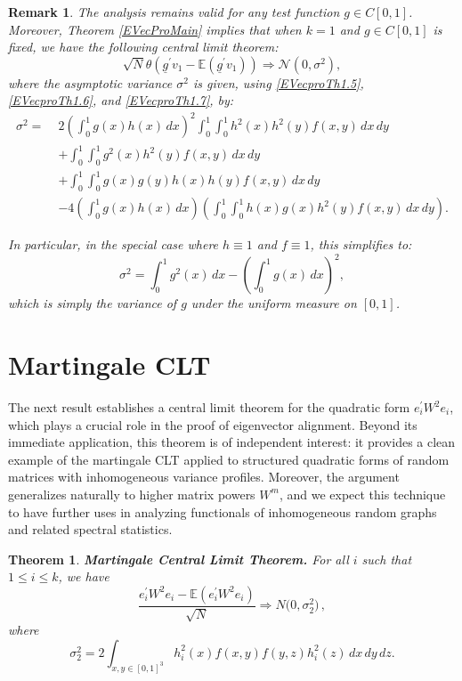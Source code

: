 \documentclass[11pt, reqno]{amsart}
\numberwithin{equation}{section}
\newtheorem{theorem}{Theorem}[section]
\newtheorem{remark}{Remark}[section]
\begin{document}
\begin{remark}\label{EVecproTh1.GaussianLimit}
The analysis remains valid for any test function \( g \in C[0,1] \). Moreover, Theorem \ref{EVecProMain} implies that when \( k = 1 \) and \( g \in C[0,1] \) is fixed, we have the following central limit theorem:
\[
\sqrt{N}\theta\left(\underline{g}^\prime v_1 - \mathbb{E}(\underline{g}^\prime v_1)\right) \Rightarrow \mathcal{N}(0, \sigma^2),
\]
where the asymptotic variance \( \sigma^2 \) is given, using \eqref{EVecproTh1.5}, \eqref{EVecproTh1.6}, and \eqref{EVecproTh1.7}, by:
\begin{align*}
\sigma^2 =\;& 2\left(\int_0^1 g(x)h(x)\,dx\right)^2 \int_0^1\int_0^1 h^2(x)h^2(y)f(x,y)\,dx\,dy \\
& + \int_0^1\int_0^1 g^2(x) h^2(y) f(x,y)\,dx\,dy \\
& + \int_0^1\int_0^1 g(x)g(y)h(x)h(y)f(x,y)\,dx\,dy \\
& - 4\left(\int_0^1 g(x)h(x)\,dx\right)\left(\int_0^1\int_0^1 h(x)g(x)h^2(y)f(x,y)\,dx\,dy\right).
\end{align*}

In particular, in the special case where \( h \equiv 1 \) and \( f \equiv 1 \), this simplifies to:
\[
\sigma^2 = \int_0^1 g^2(x)\,dx - \left(\int_0^1 g(x)\,dx\right)^2,
\]
which is simply the variance of \( g \) under the uniform measure on \([0,1]\).
\end{remark}




\section{Martingale CLT}\label{section:MartingaleCLT}
The next result establishes a central limit theorem for the quadratic form $e_i^\prime W^2 e_i$, which plays a crucial role in the proof of eigenvector alignment. Beyond its immediate application, this theorem is of independent interest: it provides a clean example of the martingale CLT applied to structured quadratic forms of random matrices with inhomogeneous variance profiles. Moreover, the argument generalizes naturally to higher matrix powers $W^m$, and we expect this technique to have further uses in analyzing functionals of inhomogeneous random graphs and related spectral statistics.


\begin{theorem}\label{Th.MartingaleCLT}
\textbf{Martingale Central Limit Theorem.} For all $i$ such that $1 \leq i \leq k$, we have
\[
\frac{e_i^\prime W^2 e_i - \mathbb{E}(e_i^\prime W^2 e_i)}{\sqrt{N}} \Rightarrow  N\bigg(0,\sigma_2^2\bigg)\,,
\]
where 
\[
\sigma_2^2 = 2\int_{x,y \in [0,1]^3} h_i^2(x) f(x,y) f(y,z) h_i^2(z)\,dx\,dy\, dz.
\]
\end{theorem}
\end{document}
